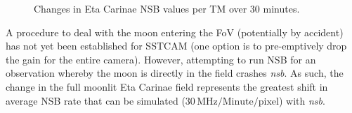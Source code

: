 \begin{figure}[t!]
\begin{minipage}{\linewidth}\centering
{}
\caption{Changes in Eta Carinae NSB values per TM over 30 minutes.}
\label{fig:30minsetacarTM}
\end{minipage}
\end{figure} 
A procedure to deal with the moon entering the FoV (potentially by accident) has not yet been established for SSTCAM (one option is to pre-emptively drop the gain for the entire camera). However, attempting to run NSB for an observation whereby the moon is directly in the field crashes \textit{nsb}. As such, the change in the full moonlit Eta Carinae field represents the greatest shift in average NSB rate that can be simulated ($\mathrm{30\,MHz/Minute/pixel}$) with \textit{nsb}.

